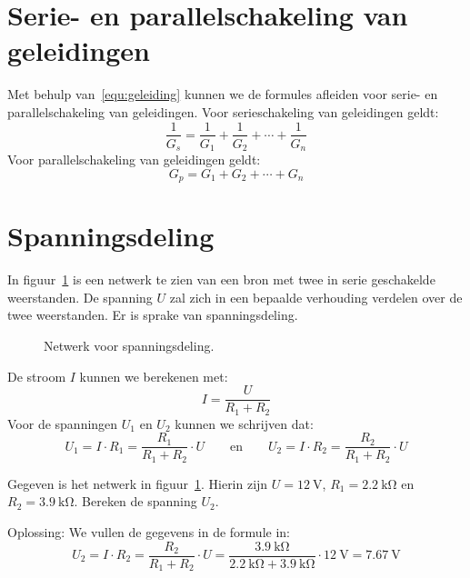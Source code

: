 \section{Serie- en parallelschakeling van geleidingen}
Met behulp van~\eqref{equ:geleiding} kunnen we de formules afleiden voor serie- en parallelschakeling van geleidingen. Voor serieschakeling van geleidingen geldt:
%
\begin{equation}
\dfrac{1}{G_s} = \dfrac{1}{G_1} + \dfrac{1}{G_2} + \cdots + \dfrac{1}{G_n}
\end{equation}
%
Voor parallelschakeling van geleidingen geldt:
%
\begin{equation}
G_p = G_1 + G_2 + \cdots + G_n
\end{equation}


\section{Spanningsdeling}
In figuur~\ref{fig:gelspanningsdeling} is een netwerk te zien van een bron met twee in
serie geschakelde weerstanden. De spanning $U$ zal zich in een bepaalde verhouding
verdelen over de twee weerstanden. Er is sprake van spanningsdeling.

\begin{figure}[!ht]
\centering
{}
\caption{Netwerk voor spanningsdeling.}
\label{fig:gelspanningsdeling}
\end{figure}

De stroom $I$ kunnen we berekenen met:
%
\begin{equation}
I = \dfrac{U}{R_1+R_2}
\end{equation} 
%
Voor de spanningen $U_1$ en $U_2$ kunnen we schrijven dat:
%
\begin{equation}
U_1 = I\cdot R_1 = \dfrac{R_1}{R_1+R_2}\cdot U \qquad\text{en}\qquad U_2 = I\cdot R_2 = \dfrac{R_2}{R_1+R_2}\cdot U
\end{equation}

\begin{example}[Spanningsdeling]
Gegeven is het netwerk in figuur~\ref{fig:gelspanningsdeling}. Hierin zijn $U=\SI{12}{\volt}$, $R_1=\SI{2.2}{\kilo\ohm}$
en $R_2=\SI{3.9}{\kilo\ohm}$. Bereken de spanning $U_2$.

Oplossing: We vullen de gegevens in de formule in:
\begin{equation}
U_2 = I\cdot R_2 = \dfrac{R_2}{R_1+R_2}\cdot U = \dfrac{\SI{3.9}{\kilo\ohm}}{\SI{2.2}{\kilo\ohm}+\SI{3.9}{\kilo\ohm}}\cdot\SI{12}{\volt} = \SI{7.67}{\volt}
\end{equation}
\end{example}


